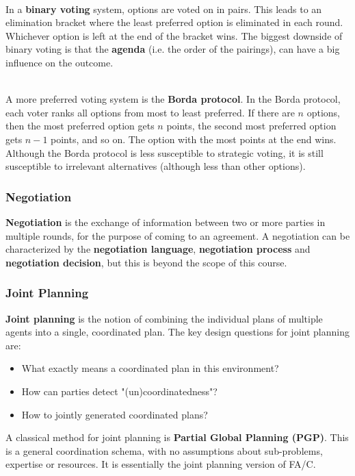 \documentclass[12pt]{article}
\begin{document}
\noindent
\\
In a \textbf{binary voting} system, options are voted on in pairs.
This leads to an elimination bracket where the least preferred option is eliminated in each round.
Whichever option is left at the end of the bracket wins.
The biggest downside of binary voting is that the \textbf{agenda} (i.e. the order of the pairings), can have a big influence on the outcome.

\noindent
\\
A more preferred voting system is the \textbf{Borda protocol}.
In the Borda protocol, each voter ranks all options from most to least preferred.
If there are $n$ options, then the most preferred option gets $n$ points, the second most preferred option gets $n - 1$ points, and so on.
The option with the most points at the end wins.
Although the Borda protocol is less susceptible to strategic voting, it is still susceptible to irrelevant alternatives (although less than other options).

\subsubsection{Negotiation}
\textbf{Negotiation} is the exchange of information between two or more parties in multiple rounds, for the purpose of coming to an agreement.
A negotiation can be characterized by the \textbf{negotiation language}, \textbf{negotiation process} and \textbf{negotiation decision}, but this is beyond the scope of this course.

\newpage
\subsubsection{Joint Planning}
\textbf{Joint planning} is the notion of combining the individual plans of multiple agents into a single, coordinated plan.
The key design questions for joint planning are:

\begin{itemize}
    \item What exactly means a coordinated plan in this environment?
    \item How can parties detect "(un)coordinatedness"?
    \item How to jointly generated coordinated plans?
\end{itemize}

\noindent
A classical method for joint planning is \textbf{Partial Global Planning (PGP)}.
This is a general coordination schema, with no assumptions about sub-problems, expertise or resources.
It is essentially the joint planning version of FA/C.
\end{document}
